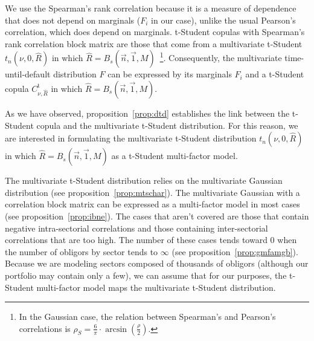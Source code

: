 \documentclass[11pt,fleqn]{book} %
\begin{document}
We use the Spearman's rank correlation because it is a measure of dependence 
that does not depend on marginals ($F_i$ in our case), unlike the usual
Pearson's correlation, which does depend on marginals. t-Student copulas 
with Spearman's rank correlation block matrix are those that come from a 
multivariate t-Student $t_n(\nu,0,\widehat{R})$ in which 
$\widehat{R} = B_s(\vec{n},\vec{1},M)$~\footnote{ In the Gaussian case, the 
relation between Spearman's and Pearson's correlations is 
$\rho_S = \frac{6}{\pi}\cdot \arcsin(\frac{\rho}{2})$.}. Consequently, 
the multivariate time-until-default distribution $F$ can be expressed by 
its marginals $F_i$ and a t-Student copula $C_{\nu,\widehat{R}}^{\text{t}}$ 
in which $\widehat{R} = B_s(\vec{n},\vec{1},M)$.

As we have observed, proposition~\ref{prop:dtd} establishes the link between 
the t-Student copula and the multivariate t-Student distribution. For this 
reason, we are interested in formulating the multivariate t-Student distribution 
$t_n(\nu,0,\widehat{R})$ in which $\widehat{R} = B_s(\vec{n},\vec{1},M)$ as 
a t-Student multi-factor model.

The multivariate t-Student distribution relies on the multivariate Gaussian
distribution (see proposition~\ref{prop:mtschar}). The multivariate Gaussian 
with a correlation block matrix can be expressed as a multi-factor model in 
most cases (see proposition~\ref{prop:ibne}). The cases that aren't covered 
are those that contain negative intra-sectorial correlations and those 
containing inter-sectorial correlations that are too high. The number of these 
cases tends toward $0$ when the number of obligors by sector tends to $\infty$ 
(see proposition~\ref{prop:gmfamgb}). Because we are modeling sectors composed 
of thousands of obligors (although our portfolio may contain only a few), we 
can assume that for our purposes, the t-Student multi-factor model maps the 
multivariate t-Student distribution.
\end{document}
